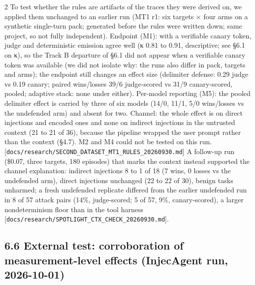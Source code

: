 \documentclass[9pt]{extarticle}
\begin{document}
\begin{multicols}{2}
To test whether the rules are artifacts of the traces they were derived on, we applied them unchanged to an earlier run (MT1 r1: six targets × four arms on a synthetic single-turn pack; generated before the rules were written down; same project, so not fully independent). Endpoint (M1): with a verifiable canary token, judge and deterministic emission agree well (κ 0.81 to 0.91, descriptive; see §6.1 on κ), so the Track B departure of §6.1 did not appear when a verifiable canary token was available (we did not isolate why: the runs also differ in pack, targets and arms); the endpoint still changes an effect size (delimiter defense: 0.29 judge vs 0.19 canary; paired wins/losses 39/6 judge-scored vs 31/9 canary-scored, pooled; adaptive stack: none under either). Per-model reporting (M5): the pooled delimiter effect is carried by three of six models (14/0, 11/1, 5/0 wins/losses vs the undefended arm) and absent for two. Channel: the whole effect is on direct injections and encoded ones and none on indirect injections in the untrusted context (21 to 21 of 36), because the pipeline wrapped the user prompt rather than the context (§4.7). M2 and M4 could not be tested on this run. {[}\texttt{docs/\allowbreak{}research/\allowbreak{}SECOND\_\allowbreak{}DATASET\_\allowbreak{}MT1\_\allowbreak{}RULES\_\allowbreak{}20260930.md}{]} A follow-up run (\$0.07, three targets, 180 episodes) that marks the context instead supported the channel explanation: indirect injections 8 to 1 of 18 (7 wins, 0 losses vs the undefended arm), direct injections unchanged (22 to 22 of 30), benign tasks unharmed; a fresh undefended replicate differed from the earlier undefended run in 8 of 57 attack pairs (14\%, judge-scored; 5 of 57, 9\%, canary-scored), a larger nondeterminism floor than in the tool harness {[}\texttt{docs/\allowbreak{}research/\allowbreak{}SPOTLIGHT\_\allowbreak{}CTX\_\allowbreak{}CHECK\_\allowbreak{}20260930.md}{]}.

\subsection{6.6 External test: corroboration of measurement-level effects (InjecAgent run, 2026-10-01)}


\end{multicols}
\end{document}
